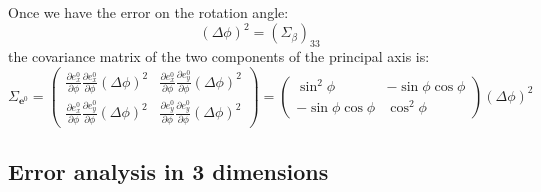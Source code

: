 \documentclass[a4paper,11pt]{article}
\newcommand{\pder}[2]{\frac{\partial#1}{\partial#2}}
\begin{document}
Once we have the error on the rotation angle:
\begin{equation}
  (\Delta\phi)^2 = (\Sigma_\beta)_{33}
\end{equation}
the covariance matrix of the two components of the principal axis is:
\begin{equation}
  \Sigma_{\mathbf{e}^0} =
  \begin{pmatrix}
    \pder{e^0_x}{\phi}\pder{e^0_x}{\phi}(\Delta\phi)^2 &
    \pder{e^0_x}{\phi}\pder{e^0_y}{\phi}(\Delta\phi)^2\\
    \pder{e^0_x}{\phi}\pder{e^0_y}{\phi}(\Delta\phi)^2 &
    \pder{e^0_y}{\phi}\pder{e^0_y}{\phi}(\Delta\phi)^2
  \end{pmatrix} =
  \begin{pmatrix}
    \sin^2\phi & -\sin\phi\cos\phi\\
    -\sin\phi\cos\phi & \cos^2\phi
  \end{pmatrix}(\Delta\phi)^2
\end{equation}


\subsection{Error analysis in 3 dimensions}
\end{document}
